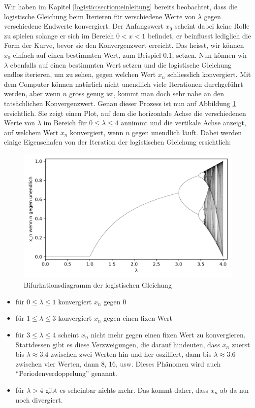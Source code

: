 Wir haben im Kapitel 
\ref{logistic:section:einleitung} 
bereits beobachtet,
dass die logistische Gleichung beim Iterieren für 
verschiedene Werte von $\lambda$ gegen verschiedene 
Endwerte konvergiert. 
Der Anfangswert $x_0$ scheint dabei keine Rolle zu spielen
solange er sich im Bereich $0 < x < 1$ befindet, 
er beinflusst lediglich die Form der Kurve, 
bevor sie den Konvergenzwert erreicht. 
Das heisst, wir können $x_0$ einfach auf einen bestimmten Wert, 
zum Beispiel 0.1, setzen. 
Nun können wir $\lambda$ ebenfalls auf einen bestimmten Wert setzen
und die logistische Gleichung endlos iterieren, 
um zu sehen, gegen welchen Wert $x_n$ schliesslich konvergiert.
Mit dem Computer können natürlich nicht unendlich viele Iterationen
durchgeführt werden, aber wenn $n$ gross genug ist, 
kommt man doch sehr nahe an den tatsächlichen Konvergenzwert. 
Genau dieser Prozess ist nun auf Abbildung \ref{fig:map_1} 
ersichtlich. 
Sie zeigt einen Plot, 
auf dem die horizontale Achse die verschiedenen Werte
von $\lambda$ im Bereich für $0 \leq \lambda \leq 4$ annimmt 
und die vertikale Achse anzeigt,
auf welchem Wert $x_n$ konvergiert, wenn $n$ gegen
unendlich läuft. Dabei werden einige Eigenschafen 
von der Iteration der logistischen Gleichung ersichtlich:
\begin{figure}
    \includegraphics[width=\linewidth]{papers/logistic/figures/map.png}
    \caption{Bifurkationsdiagramm der logistischen Gleichung}
    \label{fig:map_1}
\end{figure}
\begin{itemize}
    \item 
    für $0 \le \lambda \le 1$ konvergiert $x_n$ gegen 0
    \item 
    für $1 \le \lambda \le 3$ konvergiert $x_n$ gegen einen fixen Wert
    \item 
    für $3 \le \lambda \le 4$ scheint $x_n$ nicht mehr gegen einen fixen Wert zu konvergieren.
    Stattdessen gibt es diese Verzweigungen, 
    die darauf hindeuten, 
    dass $x_n$ zuerst bis $\lambda \approx 3.4$ zwischen zwei Werten hin und her oszilliert, 
    dann bis $\lambda \approx 3.6$ zwischen vier Werten, dann 8, 16, usw. 
    Dieses Phänomen wird auch ``Periodenverdoppelung'' genannt.
    \item
    für $\lambda > 4$ gibt es scheinbar nichts mehr.
    Das kommt daher, dass $x_n$ ab da nur noch divergiert.  
\end{itemize}

